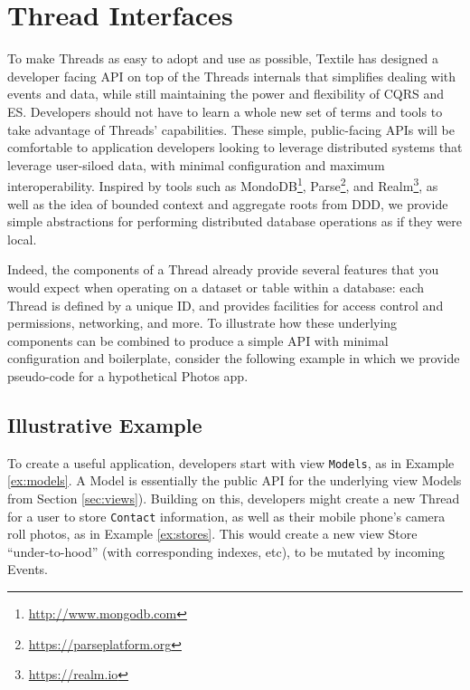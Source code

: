\documentclass{textile}
\begin{document}
\section{Thread Interfaces}\label{sec:interfaces}

To make Threads as easy to adopt and use as possible, Textile has designed a developer facing API on top of the Threads internals that simplifies dealing with events and data, while still maintaining the power and flexibility of CQRS and ES. Developers should not have to learn a whole new set of terms and tools to take advantage of Threads' capabilities. These simple, public-facing APIs will be comfortable to application developers looking to leverage distributed systems that leverage user-siloed data, with minimal configuration and maximum interoperability. Inspired by tools such as MondoDB\footnote{\url{http://www.mongodb.com}}, Parse\footnote{\url{https://parseplatform.org}}, and Realm\footnote{\url{https://realm.io}}, as well as the idea of bounded context and aggregate roots from DDD, we provide simple abstractions for performing distributed database operations as if they were local.

Indeed, the components of a Thread already provide several features that you would expect when operating on a dataset or table within a database: each Thread is defined by a unique ID, and provides facilities for access control and permissions, networking, and more. To illustrate how these underlying components can be combined to produce a simple API with minimal configuration and boilerplate, consider the following example in which we provide pseudo-code for a hypothetical Photos app.

\subsection{Illustrative Example}\label{sec:example}


To create a useful application, developers start with view \texttt{Models}, as in Example \ref{ex:models}. A Model is essentially the public API for the underlying view Models from Section \ref{sec:views}). Building on this, developers might create a new Thread for a user to store \texttt{Contact} information, as well as their mobile phone's camera roll photos, as in Example \ref{ex:stores}. This would create a new view Store ``under-to-hood'' (with corresponding indexes, etc), to be mutated by incoming Events.
\end{document}
